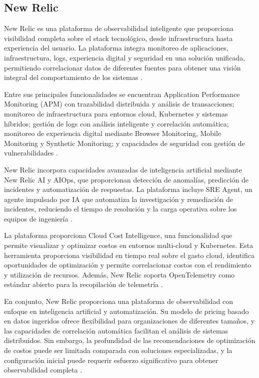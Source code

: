 \subsection{New Relic}

New Relic es una plataforma de observabilidad inteligente que proporciona visibilidad completa sobre el stack tecnológico, desde infraestructura hasta experiencia del usuario. La plataforma integra monitoreo de aplicaciones, infraestructura, logs, experiencia digital y seguridad en una solución unificada, permitiendo correlacionar datos de diferentes fuentes para obtener una visión integral del comportamiento de los sistemas \parencite{NewRelic2026}.

Entre sus principales funcionalidades se encuentran Application Performance Monitoring (APM) con trazabilidad distribuida y análisis de transacciones; monitoreo de infraestructura para entornos cloud, Kubernetes y sistemas híbridos; gestión de logs con análisis inteligente y correlación automática; monitoreo de experiencia digital mediante Browser Monitoring, Mobile Monitoring y Synthetic Monitoring; y capacidades de seguridad con gestión de vulnerabilidades \parencite{NewRelic2026}.

New Relic incorpora capacidades avanzadas de inteligencia artificial mediante New Relic AI y AIOps, que proporcionan detección de anomalías, predicción de incidentes y automatización de respuestas. La plataforma incluye SRE Agent, un agente impulsado por IA que automatiza la investigación y remediación de incidentes, reduciendo el tiempo de resolución y la carga operativa sobre los equipos de ingeniería \parencite{NewRelic2026}.

La plataforma proporciona Cloud Cost Intelligence, una funcionalidad que permite visualizar y optimizar costos en entornos multi-cloud y Kubernetes. Esta herramienta proporciona visibilidad en tiempo real sobre el gasto cloud, identifica oportunidades de optimización y permite correlacionar costos con el rendimiento y utilización de recursos. Además, New Relic soporta OpenTelemetry como estándar abierto para la recopilación de telemetría \parencite{NewRelic2026}.

En conjunto, New Relic proporciona una plataforma de observabilidad con enfoque en inteligencia artificial y automatización. Su modelo de pricing basado en datos ingeridos ofrece flexibilidad para organizaciones de diferentes tamaños, y las capacidades de correlación automática facilitan el análisis de sistemas distribuidos. Sin embargo, la profundidad de las recomendaciones de optimización de costos puede ser limitada comparada con soluciones especializadas, y la configuración inicial puede requerir esfuerzo significativo para obtener observabilidad completa \parencite{NewRelic2026}.

